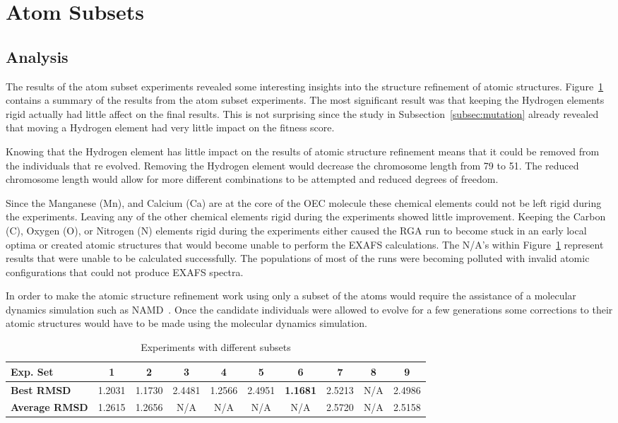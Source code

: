 \section{Atom Subsets}

\subsection{Analysis}

The results of the atom subset experiments revealed some interesting insights into the structure refinement of atomic structures. Figure~\ref{table:subset-results} contains a summary of the results from the atom subset experiments. The most significant result was that keeping the Hydrogen elements rigid actually had little affect on the final results. This is not surprising since the study in Subsection~\ref{subsec:mutation} already revealed that moving a Hydrogen element had very little impact on the fitness score.

Knowing that the Hydrogen element has little impact on the results of atomic structure refinement means that it could be removed from the individuals that re evolved. Removing the Hydrogen element would decrease the chromosome length from 79 to 51. The reduced chromosome length would allow for more different combinations to be attempted and reduced degrees of freedom.

Since the Manganese (Mn), and Calcium (Ca) are at the core of the OEC molecule these chemical elements could not be left rigid during the experiments. Leaving any of the other chemical elements rigid during the experiments showed little improvement. Keeping the Carbon (C), Oxygen (O), or Nitrogen (N) elements rigid during the experiments either caused the RGA run to become stuck in an early local optima or created atomic structures that would become unable to perform the EXAFS calculations. The N/A's within Figure~\ref{table:subset-results} represent results that were unable to be calculated successfully. The populations of most of the runs were becoming polluted with invalid atomic configurations that could not produce EXAFS spectra.

In order to make the atomic structure refinement work using only a subset of the atoms would require the assistance of a molecular dynamics simulation such as NAMD~\cite{namd}. Once the candidate individuals were allowed to evolve for a few generations some corrections to their atomic structures would have to be made using the molecular dynamics simulation.

\begin{table}
	\centering
	\begin{tabular}{ | >{\bfseries}p{1.9cm} | c | c | c | c | c | c | c | c | c | }
		\hline
		Exp. Set & 1 & 2 & 3 & 4 & 5 & 6 & 7 & 8 & 9 \\ \hline
		Best RMSD & 1.2031 & 1.1730 & 2.4481 & 1.2566 & 2.4951 & \textbf{1.1681} & 2.5213 & N/A & 2.4986 \\ \hline
		Average RMSD & 1.2615 & 1.2656 & N/A & N/A & N/A & N/A & 2.5720 & N/A & 2.5158 \\ \hline
	\end{tabular}
	\caption{Experiments with different subsets}
	\label{table:subset-results}
\end{table}
